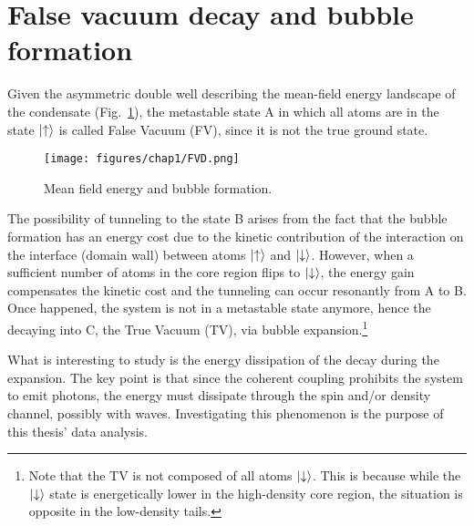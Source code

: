 \section{False vacuum decay and bubble formation}
Given the asymmetric double well describing the mean-field energy landscape of the condensate (Fig.\ \ref{fig:FVD}), the metastable state A in which all atoms are in the state $\ket{\uparrow}$ is called False Vacuum (FV), since it is not the true ground state.
\begin{figure}[h!]
    \centering
    \texttt{[image: figures/chap1/FVD.png]}
    \caption{Mean field energy and bubble formation.}
    \label{fig:FVD}
\end{figure}
The possibility of tunneling to the state B arises from the fact that the bubble formation has an energy cost due to the kinetic contribution of the interaction on the interface (domain wall) between atoms $\ket{\uparrow}$ and $\ket{\downarrow}$. However, when a sufficient number of atoms in the core region flips to $\ket{\downarrow}$, the energy gain compensates the kinetic cost and the tunneling can occur resonantly from A to B. Once happened, the system is not in a metastable state anymore, hence the decaying into C, the True Vacuum (TV), via bubble expansion.\footnote{Note that the TV is not composed of all atoms $\ket{\downarrow}$. This is because while the $\ket{\downarrow}$ state is energetically lower in the high-density core region, the situation is opposite in the low-density tails.}

What is interesting to study is the energy dissipation of the decay during the expansion. The key point is that since the coherent coupling prohibits the system to emit photons, the energy must dissipate through the spin and/or density channel, possibly with waves. Investigating this phenomenon is the purpose of this thesis' data analysis.

